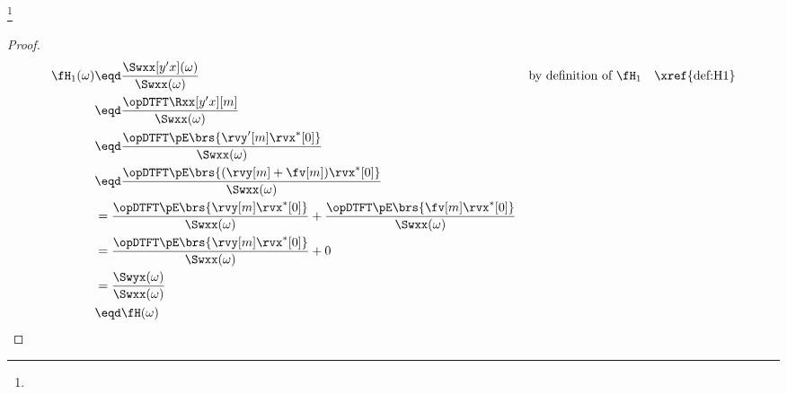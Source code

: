 \begin{proposition}
\footnote{
  }
\end{proposition}
\begin{proof}
\begin{align*}
  \fH_1(\omega)
    &\eqd \frac{\Swxx[y'x](\omega)}{\Swxx(\omega)}
    && \text{by definition of $\fH_1$}
    && \text{\xref{def:H1}}
  \\&\eqd \frac{\opDTFT\Rxx[y'x][m]}{\Swxx(\omega)}
  \\&\eqd \frac{\opDTFT\pE\brs{\rvy'[m]\rvx^\ast[0]}}{\Swxx(\omega)}
  \\&\eqd \frac{\opDTFT\pE\brs{(\rvy[m]+\fv[m])\rvx^\ast[0]}}{\Swxx(\omega)}
  \\&=    \frac{\opDTFT\pE\brs{\rvy[m]\rvx^\ast[0]}}{\Swxx(\omega)}
     +    \frac{\opDTFT\pE\brs{\fv[m]\rvx^\ast[0]}}{\Swxx(\omega)}
  \\&=    \frac{\opDTFT\pE\brs{\rvy[m]\rvx^\ast[0]}}{\Swxx(\omega)}
     +    0
  \\&=    \frac{\Swyx(\omega)}{\Swxx(\omega)}
  \\&\eqd \fH(\omega)
\end{align*}
\end{proof}
